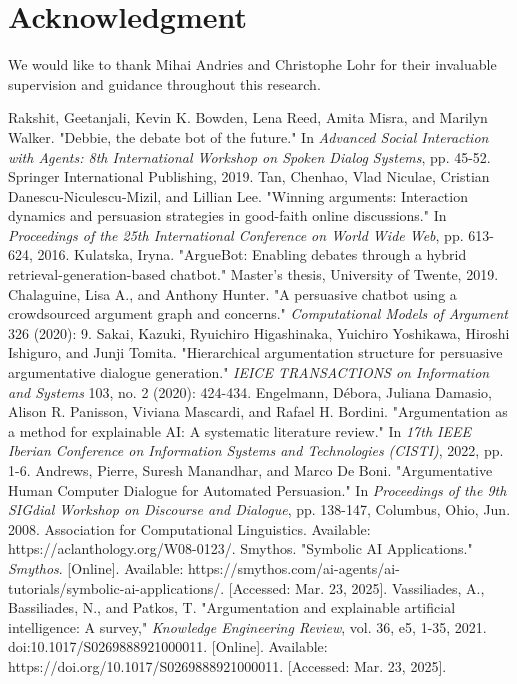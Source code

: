 \documentclass[conference]{IEEEtran}
\begin{document}
\section*{Acknowledgment}
We would like to thank Mihai Andries and Christophe Lohr for their invaluable supervision and guidance throughout this research.

\begin{thebibliography}{00}
 Rakshit, Geetanjali, Kevin K. Bowden, Lena Reed, Amita Misra, and Marilyn Walker. "Debbie, the debate bot of the future." In \textit{Advanced Social Interaction with Agents: 8th International Workshop on Spoken Dialog Systems}, pp. 45-52. Springer International Publishing, 2019.
 Tan, Chenhao, Vlad Niculae, Cristian Danescu-Niculescu-Mizil, and Lillian Lee. "Winning arguments: Interaction dynamics and persuasion strategies in good-faith online discussions." In \textit{Proceedings of the 25th International Conference on World Wide Web}, pp. 613-624, 2016.
 Kulatska, Iryna. "ArgueBot: Enabling debates through a hybrid retrieval-generation-based chatbot." Master's thesis, University of Twente, 2019.
 Chalaguine, Lisa A., and Anthony Hunter. "A persuasive chatbot using a crowdsourced argument graph and concerns." \textit{Computational Models of Argument} 326 (2020): 9.
 Sakai, Kazuki, Ryuichiro Higashinaka, Yuichiro Yoshikawa, Hiroshi Ishiguro, and Junji Tomita. "Hierarchical argumentation structure for persuasive argumentative dialogue generation." \textit{IEICE TRANSACTIONS on Information and Systems} 103, no. 2 (2020): 424-434.
 Engelmann, Débora, Juliana Damasio, Alison R. Panisson, Viviana Mascardi, and Rafael H. Bordini. "Argumentation as a method for explainable AI: A systematic literature review." In \textit{17th IEEE Iberian Conference on Information Systems and Technologies (CISTI)}, 2022, pp. 1-6.
 Andrews, Pierre, Suresh Manandhar, and Marco De Boni. "Argumentative Human Computer Dialogue for Automated Persuasion." In \textit{Proceedings of the 9th SIGdial Workshop on Discourse and Dialogue}, pp. 138-147, Columbus, Ohio, Jun. 2008. Association for Computational Linguistics. Available: https://aclanthology.org/W08-0123/.
 Smythos. "Symbolic AI Applications." \textit{Smythos}. [Online]. Available: https://smythos.com/ai-agents/ai-tutorials/symbolic-ai-applications/. [Accessed: Mar. 23, 2025].
 Vassiliades, A., Bassiliades, N., and Patkos, T. "Argumentation and explainable artificial intelligence: A survey," \textit{Knowledge Engineering Review}, vol. 36, e5, 1-35, 2021. doi:10.1017/S0269888921000011. [Online]. Available: https://doi.org/10.1017/S0269888921000011. [Accessed: Mar. 23, 2025].

\end{thebibliography}
\end{document}
